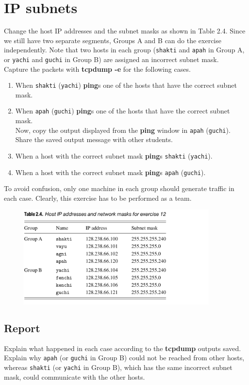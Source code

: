 \documentclass[10pt,a4paper]{article}
\numberwithin{equation}{section}
\numberwithin{figure}{section}
\numberwithin{table}{section}
\begin{document}
\section{IP subnets}
    Change the host IP addresses and the subnet masks as shown in Table 2.4. Since we still have two separate segments, Groups A and B can do the exercise independently.
    Note that two hosts in each group (\texttt{shakti} and \texttt{apah} in Group A, or \texttt{yachi} and \texttt{guchi} in Group B) are assigned an incorrect subnet mask. \\
    Capture the packets with \textbf{tcpdump -e} for the following cases. \\
    \begin{enumerate}
        \item When \texttt{shakti} (\texttt{yachi}) \textbf{ping}s one of the hosts that have the correct subnet mask.
        \item When \texttt{apah} (\texttt{guchi}) \textbf{ping}s one of the hosts that have the correct subnet mask. \\ Now, copy the output displayed from the \textbf{ping} window in \texttt{apah} (\texttt{guchi}).
        Share the saved output message with other students.
        \item When a host with the correct subnet mask \textbf{ping}s \texttt{shakti} (\texttt{yachi}).
        \item When a host with the correct subnet mask \textbf{ping}s \texttt{apah} (\texttt{guchi}).
    \end{enumerate}
    To avoid confusion, only one machine in each group should generate traffic in each case.
    Clearly, this exercise has to be performed as a team.
    \begin{figure}[H]
        \centering
        \includegraphics[width=0.9\textwidth]{img/table2-4.png}
    \end{figure}
    \subsection*{Report}
    Explain what happened in each case according to the \textbf{tcpdump} outputs saved.
    Explain why \texttt{apah} (or \texttt{guchi} in Group B) could not be reached from other hosts, whereas \texttt{shakti} (or \texttt{yachi} in Group B), which has the same incorrect subnet mask, could communicate with the other hosts.
\end{document}
